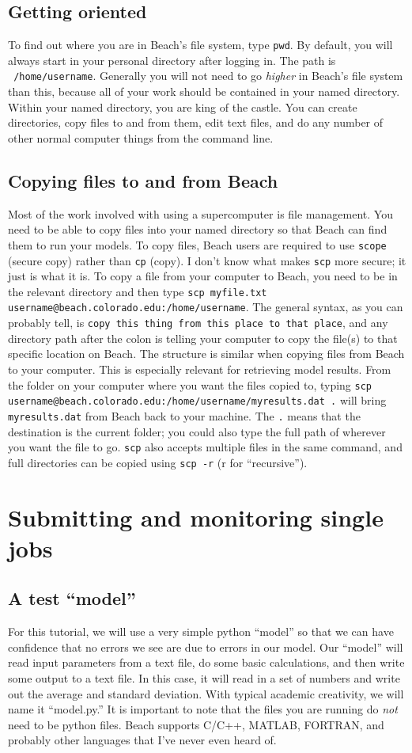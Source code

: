 \documentclass[12pt, oneside]{article}   	%
\begin{document}
\subsection{Getting oriented}
To find out where you are in Beach's file system, type \texttt{pwd}. By default, you will always start in your personal directory after logging in. The path is \texttt{~/home/username}. Generally you will not need to go \textit{higher} in Beach's file system than this, because all of your work should be contained in your named directory. Within your named directory, you are king of the castle. You can create directories, copy files to and from them, edit text files, and do any number of other normal computer things from the command line.
\subsection{Copying files to and from Beach}
Most of the work involved with using a supercomputer is file management. You need to be able to copy files into your named directory so that Beach can find them to run your models. To copy files, Beach users are required to use \texttt{scope} (secure copy) rather than \texttt{cp} (copy). I don't know what makes \texttt{scp} more secure; it just is what it is. To copy a file from your computer to Beach, you need to be in the relevant directory and then type \texttt{scp myfile.txt username@beach.colorado.edu:/home/username}. The general syntax, as you can probably tell, is \texttt{copy this thing from this place to that place}, and any directory path after the colon is telling your computer to copy the file(s) to that specific location on Beach. The structure is similar when copying files from Beach to your computer. This is especially relevant for retrieving model results. From the folder on your computer where you want the files copied to, typing \texttt{scp username@beach.colorado.edu:/home/username/myresults.dat .} will bring \texttt{myresults.dat} from Beach back to your machine. The \texttt{.} means that the destination is the current folder; you could also type the full path of wherever you want the file to go. \texttt{scp} also accepts multiple files in the same command, and full directories can be copied using \texttt{scp -r} (r for ``recursive'').

\section{Submitting and monitoring single jobs}
\subsection{A test ``model''}
For this tutorial, we will use a very simple python ``model'' so that we can have confidence that no errors we see are due to errors in our model. Our ``model'' will read input parameters from a text file, do some basic calculations, and then write some output to a text file. In this case, it will read in a set of numbers and write out the average and standard deviation. With typical academic creativity, we will name it ``model.py.'' It is important to note that the files you are running do \textit{not} need to be python files. Beach supports C/C++, MATLAB, FORTRAN, and probably other languages that I've never even heard of.
\end{document}
